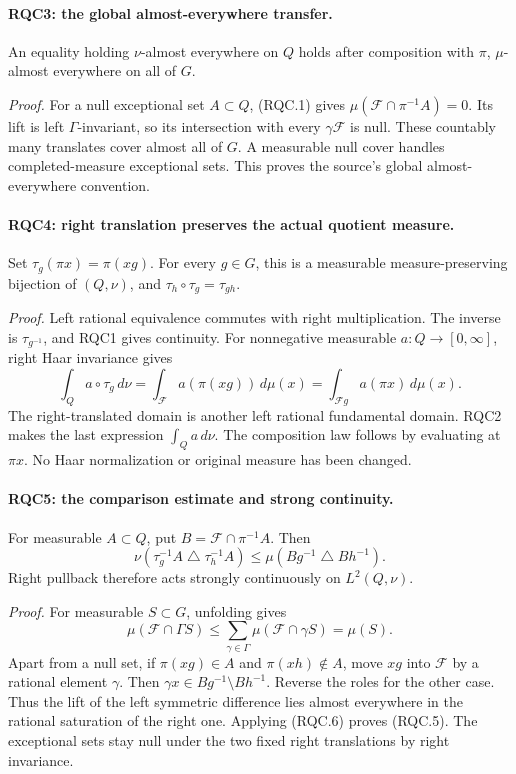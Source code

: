 \documentclass[11pt,a4paper]{article}
\numberwithin{equation}{section}
\theoremstyle{remark}\newtheorem{remark}[theorem]{Remark}
\begin{document}
\paragraph{RQC3: the global almost-everywhere transfer.}
\label{claim:RQC3}
An equality holding \(\nu\)-almost everywhere on \(Q\) holds after
composition with \(\pi\), \(\mu\)-almost everywhere on all of \(G\).

\emph{Proof.}
For a null exceptional set \(A\subset Q\), (RQC.1) gives
\(\mu(\mathcal F\cap\pi^{-1}A)=0\).
Its lift is left \(\Gamma\)-invariant, so its intersection with
every \(\gamma\mathcal F\) is null.  These countably many translates
cover almost all of \(G\).  A measurable null cover handles
completed-measure exceptional sets.  This proves the source's
global almost-everywhere convention.

\paragraph{RQC4: right translation preserves the actual quotient measure.}
\label{claim:RQC4}
Set \(\tau_g(\pi x)=\pi(xg)\).  For every \(g\in G\), this is a
measurable measure-preserving bijection of \((Q,\nu)\), and
\(\tau_h\circ\tau_g=\tau_{gh}\).

\emph{Proof.}
Left rational equivalence commutes with right multiplication.
The inverse is \(\tau_{g^{-1}}\), and RQC1 gives continuity.
For nonnegative measurable \(a:Q\to[0,\infty]\), right Haar
invariance gives
\[
 \int_Q a\circ\tau_g\,d\nu
 =\int_{\mathcal F}a(\pi(xg))\,d\mu(x)
 =\int_{\mathcal Fg}a(\pi x)\,d\mu(x).
 \tag{RQC.4}
\]
The right-translated domain is another left rational fundamental
domain.  RQC2 makes the last expression \(\int_Q a\,d\nu\).
The composition law follows by evaluating at \(\pi x\).
No Haar normalization or original measure has been changed.

\paragraph{RQC5: the comparison estimate and strong continuity.}
\label{claim:RQC5}
For measurable \(A\subset Q\), put \(B=\mathcal F\cap\pi^{-1}A\).
Then
\[
 \nu(\tau_g^{-1}A\mathbin{\triangle}\tau_h^{-1}A)
 \le\mu(Bg^{-1}\mathbin{\triangle}Bh^{-1}).
 \tag{RQC.5}
\]
Right pullback therefore acts strongly continuously on \(L^2(Q,\nu)\).

\emph{Proof.}
For measurable \(S\subset G\), unfolding gives
\[
 \mu(\mathcal F\cap\Gamma S)
 \le\sum_{\gamma\in\Gamma}\mu(\mathcal F\cap\gamma S)
 =\mu(S).
 \tag{RQC.6}
\]
Apart from a null set, if \(\pi(xg)\in A\) and
\(\pi(xh)\notin A\), move \(xg\) into \(\mathcal F\) by a
rational element \(\gamma\).  Then
\(\gamma x\in Bg^{-1}\setminus Bh^{-1}\).  Reverse the roles for
the other case.  Thus the lift of the left symmetric difference
lies almost everywhere in the rational saturation of the right
one.  Applying (RQC.6) proves (RQC.5).  The exceptional sets stay
null under the two fixed right translations by right invariance.
\end{document}
